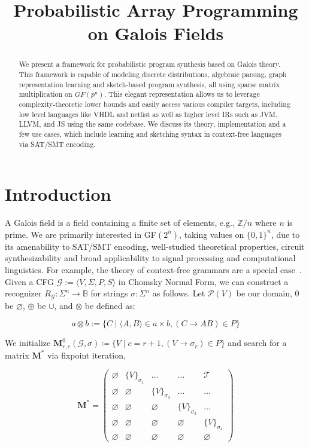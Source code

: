 \documentclass[sigplan,10pt,review,anonymous]{acmart}
\begin{document}
\title{Probabilistic Array Programming on Galois Fields}
\begin{abstract}
We present a framework for probabilistic program synthesis based on Galois theory. This framework is capable of modeling discrete distributions, algebraic parsing, graph representation learning and sketch-based program synthesis, all using sparse matrix multiplication on $GF(p^n)$. This elegant representation allows us to leverage complexity-theoretic lower bounds and easily access various compiler targets, including low level languages like VHDL and netlist as well as higher level IRs such as JVM, LLVM, and JS using the same codebase. We discuss its theory, implementation and a few use cases, which include learning and sketching syntax in context-free languages via SAT/SMT encoding.
\end{abstract}
\maketitle

\section{Introduction}

A Galois field is a field containing a finite set of elements, e.g., $\mathbb{Z}/n$ where $n$ is prime. We are primarily interested in GF$(2^n)$, taking values on $\{0, 1\}^n$, due to its amenability to SAT/SMT encoding, well-studied theoretical properties, circuit synthesizability and broad applicability to signal processing and computational linguistics. For example, the theory of context-free grammars are a special case~\citep{jansson2016certified, bakinova2020formal}. Given a CFG $\mathcal{G} := \langle V, \Sigma, P, S\rangle$ in Chomsky Normal Form, we can construct a recognizer $R_\mathcal{G}: \Sigma^n \rightarrow \mathbb{B}$ for strings $\sigma: \Sigma^n$ as follows. Let $\mathcal P(V)$ be our domain, $0$ be $\varnothing$, $\oplus$ be $\cup$, and $\otimes$ be defined as:

\vspace{-7pt}
\[
a \otimes b := \{C \mid \langle A, B\rangle \in a \times b, (C\rightarrow AB) \in P\}
\]

\noindent We initialize $\mathbf{M}^0_{r,c}(\mathcal{G}, \sigma) \coloneqq \{V \mid c = r + 1, (V \rightarrow \sigma_r) \in P\}$ and search for a matrix $\mathbf{M}^*$ via fixpoint iteration,

\vspace{-5}
\[
\mathbf{M}^* = \begin{pmatrix}
            \varnothing & \{V\}_{\sigma_1} & \ldots & \ldots & \mathcal{T} \\
            \varnothing & \varnothing & \{V\}_{\sigma_2} & \ldots & \ldots \\
            \varnothing & \varnothing & \varnothing & \{V\}_{\sigma_3} & \ldots \\
            \varnothing & \varnothing & \varnothing & \varnothing & \{V\}_{\sigma_4} \\
            \varnothing & \varnothing & \varnothing & \varnothing & \varnothing
\end{pmatrix}
\]
\end{document}
